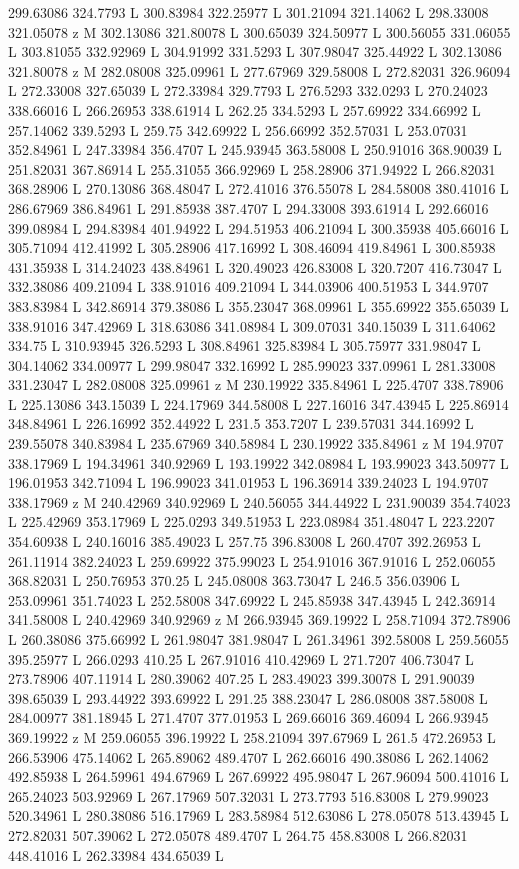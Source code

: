 {\begin{scope}[local bounding box=bb]
{299.63086 324.7793 L 300.83984 322.25977 L 301.21094 321.14062 L 298.33008 321.05078 z M 302.13086 321.80078 L 300.65039 324.50977 L 300.56055 331.06055 L 303.81055 332.92969 L 304.91992 331.5293 L 307.98047 325.44922 L 302.13086 321.80078 z M 282.08008 325.09961 L 277.67969 329.58008 L 272.82031 326.96094 L 272.33008 327.65039 L 272.33984 329.7793 L 276.5293 332.0293 L 270.24023 338.66016 L 266.26953 338.61914 L 262.25 334.5293 L 257.69922 334.66992 L 257.14062 339.5293 L 259.75 342.69922 L 256.66992 352.57031 L 253.07031 352.84961 L 247.33984 356.4707 L 245.93945 363.58008 L 250.91016 368.90039 L 251.82031 367.86914 L 255.31055 366.92969 L 258.28906 371.94922 L 266.82031 368.28906 L 270.13086 368.48047 L 272.41016 376.55078 L 284.58008 380.41016 L 286.67969 386.84961 L 291.85938 387.4707 L 294.33008 393.61914 L 292.66016 399.08984 L 294.83984 401.94922 L 294.51953 406.21094 L 300.35938 405.66016 L 305.71094 412.41992 L 305.28906 417.16992 L 308.46094 419.84961 L 300.85938 431.35938 L 314.24023 438.84961 L 320.49023 426.83008 L 320.7207 416.73047 L 332.38086 409.21094 L 338.91016 409.21094 L 344.03906 400.51953 L 344.9707 383.83984 L 342.86914 379.38086 L 355.23047 368.09961 L 355.69922 355.65039 L 338.91016 347.42969 L 318.63086 341.08984 L 309.07031 340.15039 L 311.64062 334.75 L 310.93945 326.5293 L 308.84961 325.83984 L 305.75977 331.98047 L 304.14062 334.00977 L 299.98047 332.16992 L 285.99023 337.09961 L 281.33008 331.23047 L 282.08008 325.09961 z M 230.19922 335.84961 L 225.4707 338.78906 L 225.13086 343.15039 L 224.17969 344.58008 L 227.16016 347.43945 L 225.86914 348.84961 L 226.16992 352.44922 L 231.5 353.7207 L 239.57031 344.16992 L 239.55078 340.83984 L 235.67969 340.58984 L 230.19922 335.84961 z M 194.9707 338.17969 L 194.34961 340.92969 L 193.19922 342.08984 L 193.99023 343.50977 L 196.01953 342.71094 L 196.99023 341.01953 L 196.36914 339.24023 L 194.9707 338.17969 z M 240.42969 340.92969 L 240.56055 344.44922 L 231.90039 354.74023 L 225.42969 353.17969 L 225.0293 349.51953 L 223.08984 351.48047 L 223.2207 354.60938 L 240.16016 385.49023 L 257.75 396.83008 L 260.4707 392.26953 L 261.11914 382.24023 L 259.69922 375.99023 L 254.91016 367.91016 L 252.06055 368.82031 L 250.76953 370.25 L 245.08008 363.73047 L 246.5 356.03906 L 253.09961 351.74023 L 252.58008 347.69922 L 245.85938 347.43945 L 242.36914 341.58008 L 240.42969 340.92969 z M 266.93945 369.19922 L 258.71094 372.78906 L 260.38086 375.66992 L 261.98047 381.98047 L 261.34961 392.58008 L 259.56055 395.25977 L 266.0293 410.25 L 267.91016 410.42969 L 271.7207 406.73047 L 273.78906 407.11914 L 280.39062 407.25 L 283.49023 399.30078 L 291.90039 398.65039 L 293.44922 393.69922 L 291.25 388.23047 L 286.08008 387.58008 L 284.00977 381.18945 L 271.4707 377.01953 L 269.66016 369.46094 L 266.93945 369.19922 z M 259.06055 396.19922 L 258.21094 397.67969 L 261.5 472.26953 L 266.53906 475.14062 L 265.89062 489.4707 L 262.66016 490.38086 L 262.14062 492.85938 L 264.59961 494.67969 L 267.69922 495.98047 L 267.96094 500.41016 L 265.24023 503.92969 L 267.17969 507.32031 L 273.7793 516.83008 L 279.99023 520.34961 L 280.38086 516.17969 L 283.58984 512.63086 L 278.05078 513.43945 L 272.82031 507.39062 L 272.05078 489.4707 L 264.75 458.83008 L 266.82031 448.41016 L 262.33984 434.65039 L }
\end{scope}}
